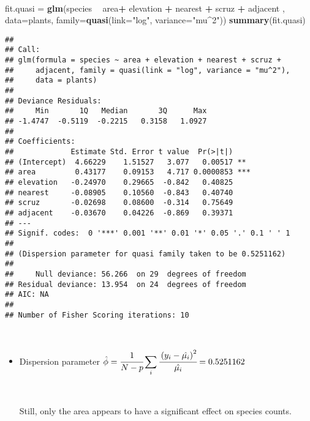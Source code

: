 \documentclass[]{article}
\newenvironment{Shaded}{\begin{snugshade}}{\end{snugshade}}
\newcommand{\KeywordTok}[1]{\textcolor[rgb]{0.13,0.29,0.53}{\textbf{#1}}}
\newcommand{\DataTypeTok}[1]{\textcolor[rgb]{0.13,0.29,0.53}{#1}}
\newcommand{\StringTok}[1]{\textcolor[rgb]{0.31,0.60,0.02}{#1}}
\newcommand{\OperatorTok}[1]{\textcolor[rgb]{0.81,0.36,0.00}{\textbf{#1}}}
\newcommand{\NormalTok}[1]{#1}
\begin{document}
~

\begin{Shaded}
\begin{Highlighting}[]
\NormalTok{fit.quasi =}\StringTok{ }\KeywordTok{glm}\NormalTok{(species }\OperatorTok{~}\StringTok{  }\NormalTok{area}\OperatorTok{+}\StringTok{ }\NormalTok{elevation }\OperatorTok{+}\StringTok{  }\NormalTok{nearest }\OperatorTok{+}\StringTok{ }\NormalTok{scruz }\OperatorTok{+}\StringTok{ }\NormalTok{adjacent ,  }\DataTypeTok{data=}\NormalTok{plants, }
  \DataTypeTok{family=}\KeywordTok{quasi}\NormalTok{(}\DataTypeTok{link=}\StringTok{"log"}\NormalTok{, }\DataTypeTok{variance=}\StringTok{"mu^2"}\NormalTok{))}
\KeywordTok{summary}\NormalTok{(fit.quasi)}
\end{Highlighting}
\end{Shaded}

\begin{verbatim}
## 
## Call:
## glm(formula = species ~ area + elevation + nearest + scruz + 
##     adjacent, family = quasi(link = "log", variance = "mu^2"), 
##     data = plants)
## 
## Deviance Residuals: 
##     Min       1Q   Median       3Q      Max  
## -1.4747  -0.5119  -0.2215   0.3158   1.0927  
## 
## Coefficients:
##             Estimate Std. Error t value  Pr(>|t|)    
## (Intercept)  4.66229    1.51527   3.077   0.00517 ** 
## area         0.43177    0.09153   4.717 0.0000853 ***
## elevation   -0.24970    0.29665  -0.842   0.40825    
## nearest     -0.08905    0.10560  -0.843   0.40740    
## scruz       -0.02698    0.08600  -0.314   0.75649    
## adjacent    -0.03670    0.04226  -0.869   0.39371    
## ---
## Signif. codes:  0 '***' 0.001 '**' 0.01 '*' 0.05 '.' 0.1 ' ' 1
## 
## (Dispersion parameter for quasi family taken to be 0.5251162)
## 
##     Null deviance: 56.266  on 29  degrees of freedom
## Residual deviance: 13.954  on 24  degrees of freedom
## AIC: NA
## 
## Number of Fisher Scoring iterations: 10
\end{verbatim}

~

\begin{itemize}\item[] 

Dispersion parameter \( \displaystyle \hat{\phi} = \cfrac{1}{N-p}  \sum_i \cfrac{\left(y_i-\hat{\mu_i}\right)^2}{\hat{\mu_i}}=  0.5251162 \)  

\ 


Still, only the area appears to have a significant effect on species counts.
\end{itemize}
\end{document}
